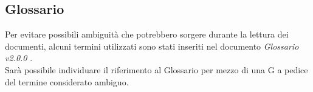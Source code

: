 \subsection{Glossario}
Per evitare possibili ambiguità che potrebbero sorgere durante la lettura dei documenti,
alcuni termini utilizzati sono stati inseriti nel documento \textit{Glossario v2.0.0 }. \\
Sarà possibile individuare il riferimento al Glossario per mezzo di una G a pedice del termine considerato ambiguo.